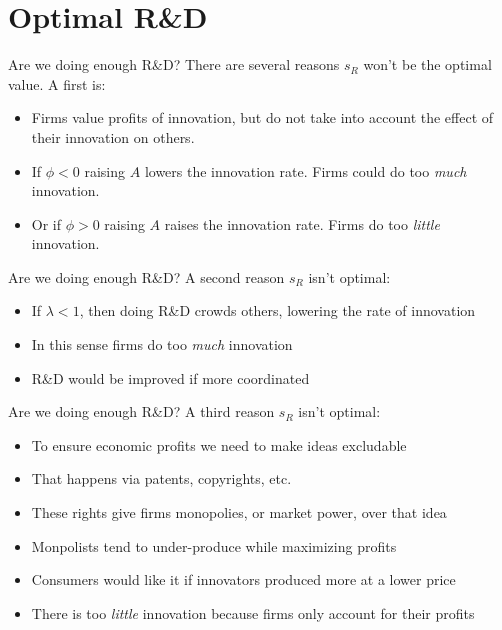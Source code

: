 \section{Optimal R\&D}
\begin{frame}{Are we doing enough R\&D?}
There are several reasons $s_R$ won't be the optimal value. A first is:
\begin{itemize}
	\item Firms value profits of innovation, but do not take into account the effect of their innovation on others. 
	\item If $\phi<0$ raising $A$ lowers the innovation rate. Firms could do too \textit{much} innovation.
	\item Or if $\phi>0$ raising $A$ raises the innovation rate. Firms do too \textit{little} innovation.
\end{itemize}

\end{frame}

\begin{frame}{Are we doing enough R\&D?}
A second reason $s_R$ isn't optimal:
\begin{itemize}
	\item If $\lambda < 1$, then doing R\&D crowds others, lowering the rate of innovation
	\item In this sense firms do too \textit{much} innovation
	\item R\&D would be improved if more coordinated
\end{itemize}

\end{frame}

\begin{frame}{Are we doing enough R\&D?}
A third reason $s_R$ isn't optimal:
\begin{itemize}
	\item To ensure economic profits we need to make ideas excludable
	\item That happens via patents, copyrights, etc.
	\item These rights give firms monopolies, or market power, over that idea
	\item Monpolists tend to under-produce while maximizing profits
	\item Consumers would like it if innovators produced more at a lower price
	\item There is too \textit{little} innovation because firms only account for their profits
\end{itemize}

\end{frame}

